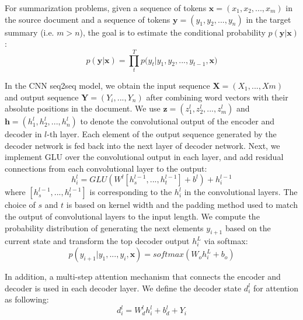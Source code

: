 For summarization problems, given a sequence of tokens $\textbf{x} = (x_{1},x_{2},...,x_{m})$ in the
source document and a sequence of tokens
$\textbf{y} = (y_{1}, y_{2},..., y_{n})$ in the target summary (i.e. $m>n$),
the goal is to estimate the conditional probability
$p(\textbf{y}|\textbf{x})$:
\begin{equation}
p(\textbf{y} | \textbf{x}) \!=\! {\prod^T_{t} {p(y_{t} | y_{1}, y_{2},..., y_{t-1}, \textbf{x}})}
\end{equation}

In the CNN seq2seq model, we obtain the input sequence
$\textbf{X}=(X_{1},...,{Xm})$ and output sequence $\textbf{Y}=(Y_{i},...,Y_{n})$
after combining word vectors with their absolute positions in the document.
We use $\textbf{z}=(z^l_{1}, z^l_{2},..., z^l_{m})$ and
$\textbf{h}=(h^l_{1}, h^l_{2},..., h^l_{n})$
to denote the convolutional output of the encoder and decoder in $l$-th layer.
Each element of the output sequence generated by the decoder network
is fed back into the next layer of decoder network.
Next, we implement GLU \cite{DauphinFAG17} over the convolutional output 
in each layer,
and add residual connections \cite{HeZRS16} from each convolutional layer
to the output:
\begin{equation}
h^l_{i} \!=\! GLU(W^l[h^{l-1}_{s},...,h^{l-1}_{t}]\!+\!b^l)\!+\!h^{l-1}_{i}
\end{equation}
where $[h^{l-1}_{s},...,h^{l-1}_{t}]$ is corresponding to the $h^l_{i}$ in the
convolutional layers. The choice of $s$ and $t$ is based on kernel width and the padding method used
to match the output of convolutional layers to the input length.
We compute the probability distribution of generating the
next elements $y_{i+1}$ based
on the current state and transform the top decoder output $h^L_{i}$ via softmax:
\begin{equation}
p(y_{i+1}|y_{1},...,y_{i},\textbf{x})\!=\!softmax(W_{o}h^L_{i}\!+\!b_{o})
\end{equation}

In addition, a multi-step attention mechanism that connects the encoder and
decoder is used in each decoder layer. 
We define the decoder state $d^l_{i}$ for attention as following:
\begin{equation}
d^l_{i}\!=\!W^l_{d}h^l_{i}\!+\!b^l_{d}+Y_{i}
\end{equation}

